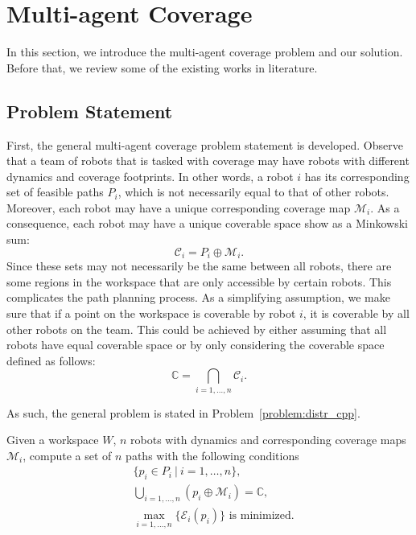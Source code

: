 \documentclass[../main.tex]{subfiles}
\begin{document}
\chapter{Multi-agent Coverage}
\label{chapter:multi-agent_coverage}

In this section, we introduce the multi-agent coverage problem and our solution. Before that, we review some of the existing works in literature.


\section{Problem Statement}
\label{sec:multi_problem_statement}

First, the general multi-agent coverage problem statement is developed. Observe that a team of robots that is tasked with coverage may have robots with different dynamics and coverage footprints. In other words, a robot $i$ has its corresponding set of feasible paths $P_i$, which is not necessarily equal to that of other robots. Moreover, each robot may have a unique corresponding coverage map $\mathcal{M}_i$. As a consequence, each robot may have a unique coverable space show as a Minkowski sum:
\begin{equation}
	\mathcal{C}_i=P_i\oplus \mathcal{M}_i.
\end{equation}
Since these sets may not necessarily be the same between all robots, there are some regions in the workspace that are only accessible by certain robots. This complicates the path planning process. As a simplifying assumption, we make sure that if a point on the workspace is coverable by robot $i$, it is coverable by all other robots on the team. This could be achieved by either assuming that all robots have equal coverable space or by only considering the coverable space defined as follows:
\begin{equation}
	\mathbb{C}=\bigcap_{i=1,\ldots,n}\mathcal{C}_i.
\end{equation}

As such, the general problem is stated in Problem~\ref{problem:distr_cpp}.

\begin{problem}
\label{problem:distr_cpp}
	Given a workspace $W$, $n$ robots with dynamics and corresponding coverage maps $\mathcal{M}_i$, compute a set of $n$ paths with the following conditions
	\begin{equation}
	\begin{aligned}
		& \{p_i\in P_{i}\ |\ i=1,\dots,n\},\\
		& \bigcup_{i=1,\dots,n}(p_i\oplus\mathcal{M}_i)=\mathbb{C},\\
		& \max_{i=1,\ldots,n}\{\mathcal{E}_i(p_i)\}\text{ is minimized.}
	\end{aligned}
	\end{equation}
\end{problem}
\end{document}
